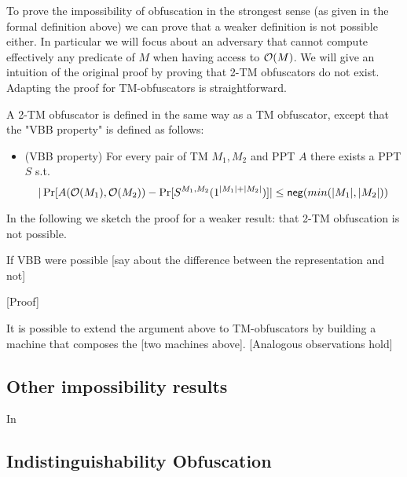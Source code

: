 To prove the impossibility of obfuscation in the strongest sense (as given in the formal definition above) we can prove that a weaker definition is not possible either. In particular we will focus about an adversary that cannot compute effectively any predicate of $M$ when having access to $\mathcal{O}(M)$.
We will give an intuition of the original proof by proving that 2-TM obfuscators do not exist. Adapting the proof for TM-obfuscators is straightforward.

\begin{mydef}
	A 2-TM obfuscator is defined in the same way as a TM obfuscator, except that the "VBB property" is defined as follows:
	\begin{itemize}
		\item (VBB property) For every pair of TM $M_1, M_2$ and PPT $A$ there exists a PPT $S$ s.t. 
		$$ |\Pr[A(\mathcal{O}(M_1), \mathcal{O}(M_2)) - \Pr[ S^{M_1,M_2}(1^{|M_1|+|M_2|})]| \leq \mathsf{neg}(min(|M_1|, |M_2|)) $$
	\end{itemize}
\end{mydef} 



In the following we sketch the proof for a weaker result: that 2-TM obfuscation is not possible.

If VBB were possible [say about the difference between the representation and not]

[Proof]

It is possible to extend the argument above to TM-obfuscators by building a machine that composes the [two machines above]. [Analogous observations hold]

\subsection{Other impossibility results}




% 

In \cite{VBB-imp} 

\subsection{Indistinguishability Obfuscation}

